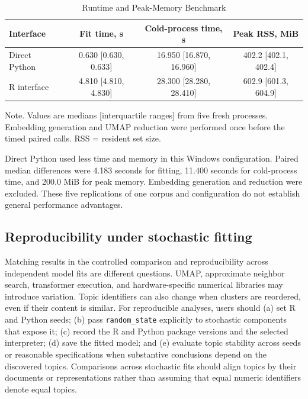 \documentclass[12pt]{article}
\newcommand{\code}[1]{\texttt{#1}}
\begin{document}
\begin{table}[htbp]
\centering
\caption{Runtime and Peak-Memory Benchmark}
\label{tab:benchmark}
\begin{threeparttable}
\begin{tabular}{lccc}
\toprule
Interface & Fit time, s & Cold-process time, s & Peak RSS, MiB \\
\midrule
Direct Python & 0.630 [0.630, 0.633] & 16.950 [16.870, 16.960] & 402.2 [402.1, 402.4] \\
R interface & 4.810 [4.810, 4.830] & 28.300 [28.280, 28.410] & 602.9 [601.3, 604.9] \\
\bottomrule
\end{tabular}
\begin{tablenotes}
\footnotesize
\item Note. Values are medians [interquartile ranges] from five fresh processes. Embedding generation and UMAP reduction were performed once before the timed paired calls. RSS = resident set size.
\end{tablenotes}
\end{threeparttable}
\end{table}

Direct Python used less time and memory in this Windows configuration. Paired median differences were 4.183 seconds for fitting, 11.400 seconds for cold-process time, and 200.0 MiB for peak memory. Embedding generation and reduction were excluded. These five replications of one corpus and configuration do not establish general performance advantages.

\subsection{Reproducibility under stochastic fitting}

Matching results in the controlled comparison and reproducibility across independent model fits are different questions. UMAP, approximate neighbor search, transformer execution, and hardware-specific numerical libraries may introduce variation. Topic identifiers can also change when clusters are reordered, even if their content is similar. For reproducible analyses, users should (a) set R and Python seeds; (b) pass \code{random\_state} explicitly to stochastic components that expose it; (c) record the R and Python package versions and the selected interpreter; (d) save the fitted model; and (e) evaluate topic stability across seeds or reasonable specifications when substantive conclusions depend on the discovered topics. Comparisons across stochastic fits should align topics by their documents or representations rather than assuming that equal numeric identifiers denote equal topics.
\end{document}
